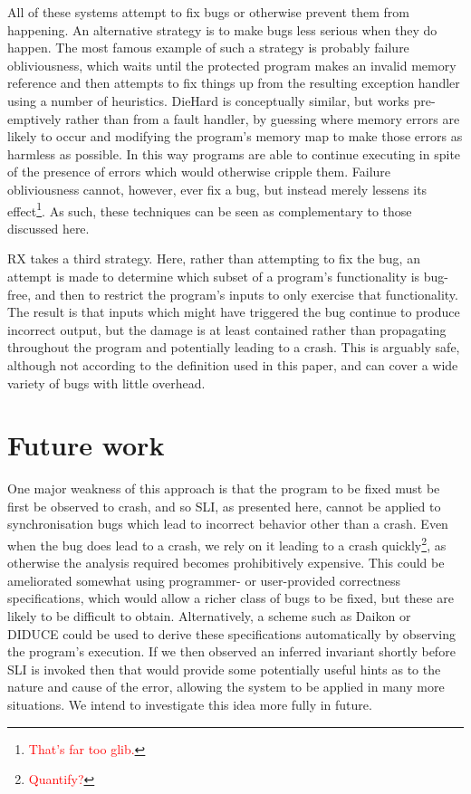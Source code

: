 \documentclass[10pt,twocolumn,preprint,natbib,authoryear]{sigplanconf}
\newcommand{\editorial}[1]{\textcolor{red}{\footnote{\textcolor{red}{#1}}}}
\begin{document}
All of these systems attempt to fix bugs or otherwise prevent them
from happening.  An alternative strategy is to make bugs less serious
when they do happen.  The most famous example of such a strategy is
probably failure obliviousness\cite{Rinard2004}, which waits until the
protected program makes an invalid memory reference and then attempts
to fix things up from the resulting exception handler using a number
of heuristics.  DieHard\cite{Berger2006} is conceptually similar, but
works pre-emptively rather than from a fault handler, by guessing
where memory errors are likely to occur and modifying the program's
memory map to make those errors as harmless as possible.  In this way
programs are able to continue executing in spite of the presence of
errors which would otherwise cripple them.  Failure obliviousness
cannot, however, ever fix a bug, but instead merely lessens its
effect\editorial{That's far too glib.}.  As such, these techniques can
be seen as complementary to those discussed here.

RX\cite{Qin2007} takes a third strategy.  Here, rather than
attempting to fix the bug, an attempt is made to determine which
subset of a program's functionality is bug-free, and then to restrict
the program's inputs to only exercise that functionality.  The result
is that inputs which might have triggered the bug continue to produce
incorrect output, but the damage is at least contained rather than
propagating throughout the program and potentially leading to a crash.
This is arguably safe, although not according to the definition used
in this paper, and can cover a wide variety of bugs with little
overhead.

\section{Future work}

One major weakness of this approach is that the program to be fixed
must be first be observed to crash, and so SLI, as presented here,
cannot be applied to synchronisation bugs which lead to incorrect
behavior other than a crash.  Even when the bug does lead to a crash,
we rely on it leading to a crash quickly\editorial{Quantify?}, as
otherwise the analysis required becomes prohibitively expensive.  This
could be ameliorated somewhat using programmer- or user-provided
correctness specifications, which would allow a richer class of bugs
to be fixed, but these are likely to be difficult to obtain.
Alternatively, a scheme such as Daikon\cite{Ernst2007} or
DIDUCE\cite{Hangal2002} could be used to derive these specifications
automatically by observing the program's execution.  If we then
observed an inferred invariant shortly before SLI is invoked then that
would provide some potentially useful hints as to the nature and cause
of the error, allowing the system to be applied in many more
situations.  We intend to investigate this idea more fully in future.
\end{document}
